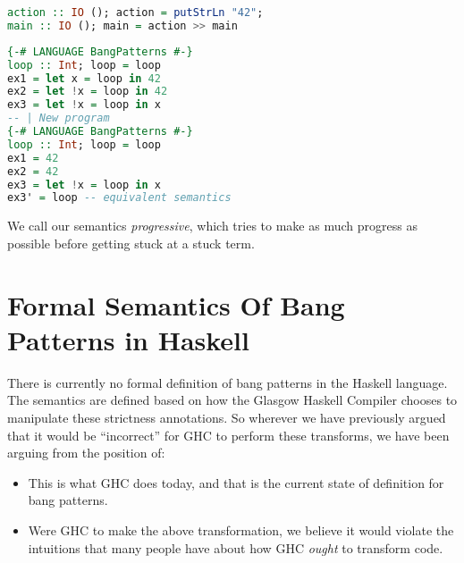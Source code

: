\documentclass[sigplan,\review anonymous]{acmart}
\begin{document}
\begin{lstlisting}[language=haskell, caption=A program that makes progress without terminating.  We wish to preserve such program semantics]
action :: IO (); action = putStrLn "42";
main :: IO (); main = action >> main
\end{lstlisting}

    
\begin{lstlisting}[language=haskell]
{-# LANGUAGE BangPatterns #-}
loop :: Int; loop = loop
ex1 = let x = loop in 42
ex2 = let !x = loop in 42
ex3 = let !x = loop in x
-- | New program
{-# LANGUAGE BangPatterns #-}
loop :: Int; loop = loop
ex1 = 42
ex2 = 42
ex3 = let !x = loop in x
ex3' = loop -- equivalent semantics
\end{lstlisting}

We call our semantics \emph{progressive}, which tries to make as much progress
as possible before getting stuck at a stuck term.
\section{Formal Semantics Of Bang Patterns in Haskell}

There is currently no formal definition of bang patterns in the Haskell language.
The semantics are defined based on how the Glasgow Haskell Compiler chooses
to manipulate these strictness annotations. So wherever we have previously argued
that it would be ``incorrect'' for GHC to perform these transforms, we have been
arguing from the position of:

\begin{itemize}
\item This is what GHC does today, and that is the current state of definition for bang patterns.
\item Were GHC to make the above transformation, we believe it would violate the
      intuitions that many people have about how GHC \emph{ought} to transform code.
\end{itemize}
\end{document}
